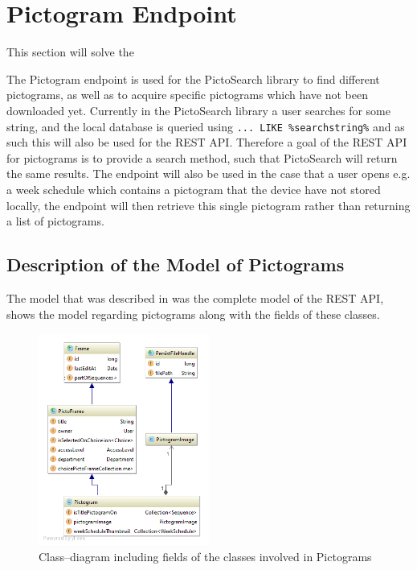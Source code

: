 \section{Pictogram Endpoint}\label{pictogramendpoint}
This section will solve the 

The Pictogram endpoint is used for the PictoSearch library to find different pictograms, as well as to acquire specific pictograms which have not been downloaded yet.
Currently in the PictoSearch library a user searches for some string, and the local database is queried using \texttt{... LIKE \%searchstring\%} and as such this will also be used for the REST API.
Therefore a goal of the REST API for pictograms is to provide a search method, such that PictoSearch will return the same results.
The endpoint will also be used in the case that a user opens e.g. a week schedule which contains a pictogram that the device have not stored locally, the endpoint will then retrieve this single pictogram rather than returning a list of pictograms.

\subsection{Description of the Model of Pictograms}\label{subsec:pictomodel}
The model that was described in  was the complete model of the REST API,  shows the model regarding pictograms along with the fields of these classes.

\begin{figure}[h]
    \centering
    \includegraphics[width=0.5\textwidth]{figures/diagram-pictogram.png}
    \caption{Class--diagram including fields of the classes involved in Pictograms}\label{fig:pictogramModel}
\end{figure}

